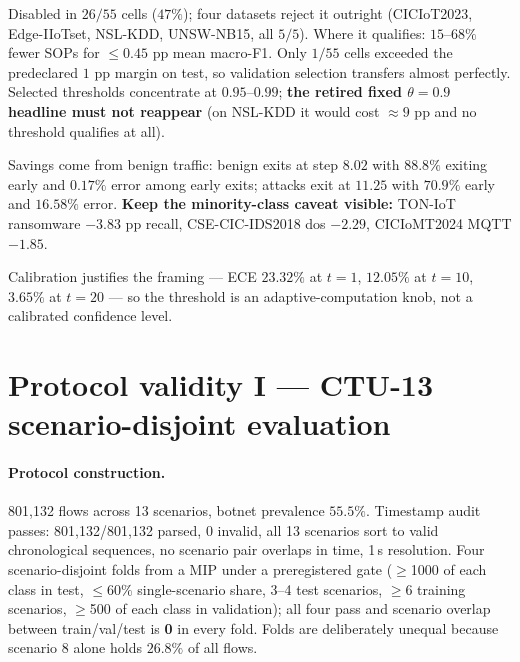 \noindent Disabled in $26/55$ cells ($47\%$); four datasets reject it outright
(CICIoT2023, Edge-IIoTset, NSL-KDD, UNSW-NB15, all $5/5$). Where it qualifies:
$15$--$68\%$ fewer SOPs for $\leq0.45$ pp mean macro-F1. Only $1/55$ cells exceeded
the predeclared $1$ pp margin on test, so validation selection transfers almost
perfectly. Selected thresholds concentrate at $0.95$--$0.99$; \textbf{the retired
fixed $\theta=0.9$ headline must not reappear} (on NSL-KDD it would cost $\approx9$ pp
and no threshold qualifies at all).

Savings come from benign traffic: benign exits at step $8.02$ with $88.8\%$ exiting
early and $0.17\%$ error among early exits; attacks exit at $11.25$ with $70.9\%$
early and $16.58\%$ error. \textbf{Keep the minority-class caveat visible:} TON-IoT
ransomware $-3.83$ pp recall, CSE-CIC-IDS2018 dos $-2.29$, CICIoMT2024 MQTT $-1.85$.

Calibration justifies the framing --- ECE $23.32\%$ at $t{=}1$, $12.05\%$ at
$t{=}10$, $3.65\%$ at $t{=}20$ --- so the threshold is an adaptive-computation knob,
not a calibrated confidence level.

\section*{Protocol validity I --- CTU-13 scenario-disjoint evaluation}

\paragraph{Protocol construction.} 801{,}132 flows across 13 scenarios, botnet
prevalence $55.5\%$. Timestamp audit passes: 801{,}132/801{,}132 parsed, 0 invalid, all
13 scenarios sort to valid chronological sequences, no scenario pair overlaps in time,
1\,\textmu s resolution. Four scenario-disjoint folds from a MIP under a preregistered
gate ($\geq$1000 of each class in test, $\leq60\%$ single-scenario share, 3--4 test
scenarios, $\geq$6 training scenarios, $\geq$500 of each class in validation); all four
pass and scenario overlap between train/val/test is \textbf{0} in every fold. Folds are
deliberately unequal because scenario 8 alone holds $26.8\%$ of all flows.

